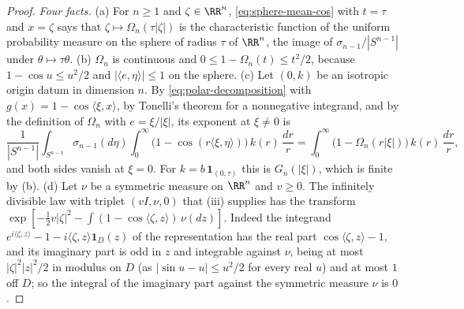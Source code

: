 \begin{proof}
\emph{Four facts.} (a) For $n \ge 1$ and $\zeta \in \RR^n$, \ref{eq:sphere-mean-cos} with
$t = \tau$ and $x = \zeta$ says that $\zeta \mapsto \Omega_n(\tau|\zeta|)$ is the characteristic
function of the uniform probability measure on the sphere of radius $\tau$ of $\RR^n$, the image
of $\sigma_{n-1}/|S^{n-1}|$ under $\theta \mapsto \tau\theta$. (b) $\Omega_n$ is continuous and
$0 \le 1 - \Omega_n(t) \le t^2/2$, because $1 - \cos u \le u^2/2$ and
$|\langle e,\eta\rangle| \le 1$ on the sphere. (c) Let $(0,k)$ be an isotropic origin datum in
dimension $n$. By \ref{eq:polar-decomposition} with $g(x) = 1 - \cos\langle\xi,x\rangle$, by
Tonelli's theorem for a nonnegative integrand, and by the definition of $\Omega_n$ with
$e = \xi/|\xi|$, its exponent at $\xi \ne 0$ is
\[
  \frac{1}{|S^{n-1}|}\int_{S^{n-1}}\sigma_{n-1}(d\eta)\int_0^\infty
     \bigl(1 - \cos(r\langle\xi,\eta\rangle)\bigr)\,k(r)\,\frac{dr}{r}
   = \int_0^\infty \bigl(1 - \Omega_n(r|\xi|)\bigr)\,k(r)\,\frac{dr}{r} ,
\]
and both sides vanish at $\xi = 0$. For $k = b\,\mathbf 1_{(0,\tau)}$ this is $G_n(|\xi|)$, which
is finite by (b). (d) Let $\nu$ be a symmetric \Levy{} measure on $\RR^n$ and $v \ge 0$. The
infinitely divisible law with triplet $(vI, \nu, 0)$ that (iii) supplies has the
transform $\exp[-\tfrac12 v|\zeta|^2 - \int(1 - \cos\langle\zeta,z\rangle)\,\nu(dz)]$. Indeed
the integrand $e^{i\langle\zeta,z\rangle} - 1 - i\langle\zeta,z\rangle\mathbf 1_D(z)$ of the
representation has the real part $\cos\langle\zeta,z\rangle - 1$, and its imaginary part is odd
in $z$ and integrable against $\nu$, being at most $|\zeta|^2|z|^2/2$ in modulus on $D$ (as
$|\sin u - u| \le u^2/2$ for every real $u$) and at most $1$ off $D$; so the integral of the
imaginary part against the symmetric measure $\nu$ is $0$.


\end{proof}

